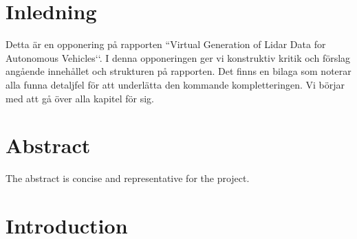 \documentclass[12pt,a4paper,twoside,openright]{report}
\begin{document}
 


\newcommand{\varHeadline}{Opponering av DATX02-17-10}
\newcommand{\varSubtitle}{Av DATX02-17-12}
\newcommand{\varDepartment}{Department of Computer Science and Engineering}
\newcommand{\varNames}{André Perzon, Björn Strömberg, Chi Thong Luong,  \\
Elias Forsberg, Jesper Åberg, Jon Johnsson}




\section*{Inledning}

	Detta är en opponering på rapporten ``Virtual Generation of Lidar Data for
	Autonomous Vehicles‘‘. I denna opponeringen ger vi konstruktiv kritik och
	förslag angående innehållet och strukturen på rapporten. Det finns en
	bilaga som noterar alla funna detaljfel för att underlätta den kommande
	kompletteringen. Vi börjar med att gå över alla kapitel för sig. 

\section*{Abstract}

	The abstract is concise and representative for the project.

\section*{Introduction}
\end{document}
